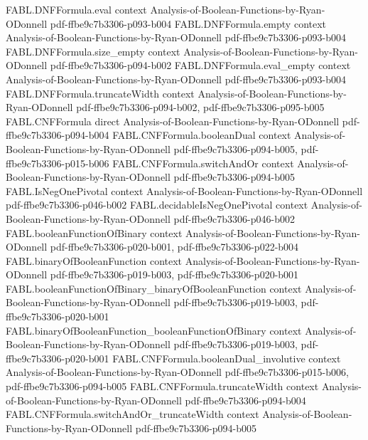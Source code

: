 \begin{theorem}
\proofstep
  {FABL.DNFFormula.eval}
  {context}
  {Analysis-of-Boolean-Functions-by-Ryan-ODonnell}
  {pdf-ffbe9c7b3306-p093-b004}
\proofstep
  {FABL.DNFFormula.empty}
  {context}
  {Analysis-of-Boolean-Functions-by-Ryan-ODonnell}
  {pdf-ffbe9c7b3306-p093-b004}
\proofstep
  {FABL.DNFFormula.size_empty}
  {context}
  {Analysis-of-Boolean-Functions-by-Ryan-ODonnell}
  {pdf-ffbe9c7b3306-p094-b002}
\proofstep
  {FABL.DNFFormula.eval_empty}
  {context}
  {Analysis-of-Boolean-Functions-by-Ryan-ODonnell}
  {pdf-ffbe9c7b3306-p093-b004}
\proofstep
  {FABL.DNFFormula.truncateWidth}
  {context}
  {Analysis-of-Boolean-Functions-by-Ryan-ODonnell}
  {pdf-ffbe9c7b3306-p094-b002,
    pdf-ffbe9c7b3306-p095-b005}
\proofstep
  {FABL.CNFFormula}
  {direct}
  {Analysis-of-Boolean-Functions-by-Ryan-ODonnell}
  {pdf-ffbe9c7b3306-p094-b004}
\proofstep
  {FABL.CNFFormula.booleanDual}
  {context}
  {Analysis-of-Boolean-Functions-by-Ryan-ODonnell}
  {pdf-ffbe9c7b3306-p094-b005,
    pdf-ffbe9c7b3306-p015-b006}
\proofstep
  {FABL.CNFFormula.switchAndOr}
  {context}
  {Analysis-of-Boolean-Functions-by-Ryan-ODonnell}
  {pdf-ffbe9c7b3306-p094-b005}
\proofstep
  {FABL.IsNegOnePivotal}
  {context}
  {Analysis-of-Boolean-Functions-by-Ryan-ODonnell}
  {pdf-ffbe9c7b3306-p046-b002}
\proofstep
  {FABL.decidableIsNegOnePivotal}
  {context}
  {Analysis-of-Boolean-Functions-by-Ryan-ODonnell}
  {pdf-ffbe9c7b3306-p046-b002}
\proofstep
  {FABL.booleanFunctionOfBinary}
  {context}
  {Analysis-of-Boolean-Functions-by-Ryan-ODonnell}
  {pdf-ffbe9c7b3306-p020-b001,
    pdf-ffbe9c7b3306-p022-b004}
\proofstep
  {FABL.binaryOfBooleanFunction}
  {context}
  {Analysis-of-Boolean-Functions-by-Ryan-ODonnell}
  {pdf-ffbe9c7b3306-p019-b003,
    pdf-ffbe9c7b3306-p020-b001}
\proofstep
  {FABL.booleanFunctionOfBinary_binaryOfBooleanFunction}
  {context}
  {Analysis-of-Boolean-Functions-by-Ryan-ODonnell}
  {pdf-ffbe9c7b3306-p019-b003,
    pdf-ffbe9c7b3306-p020-b001}
\proofstep
  {FABL.binaryOfBooleanFunction_booleanFunctionOfBinary}
  {context}
  {Analysis-of-Boolean-Functions-by-Ryan-ODonnell}
  {pdf-ffbe9c7b3306-p019-b003,
    pdf-ffbe9c7b3306-p020-b001}
\proofstep
  {FABL.CNFFormula.booleanDual_involutive}
  {context}
  {Analysis-of-Boolean-Functions-by-Ryan-ODonnell}
  {pdf-ffbe9c7b3306-p015-b006,
    pdf-ffbe9c7b3306-p094-b005}
\proofstep
  {FABL.CNFFormula.truncateWidth}
  {context}
  {Analysis-of-Boolean-Functions-by-Ryan-ODonnell}
  {pdf-ffbe9c7b3306-p094-b004}
\proofstep
  {FABL.CNFFormula.switchAndOr_truncateWidth}
  {context}
  {Analysis-of-Boolean-Functions-by-Ryan-ODonnell}
  {pdf-ffbe9c7b3306-p094-b005}

\end{theorem}
